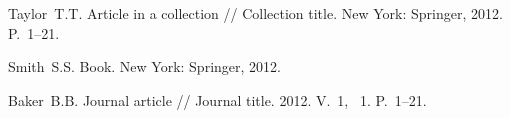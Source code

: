 \begin{references_eng}

  \item %
  Taylor~T.T. Article in a collection // Collection title. New York: Springer, 2012. P.~1--21.

  \item %
  Smith~S.S. Book. New York: Springer, 2012.

  \item
  Baker~B.B. Journal article // Journal title. 2012. V.~1, \No ~1. P.~1--21.


\end{references_eng}



